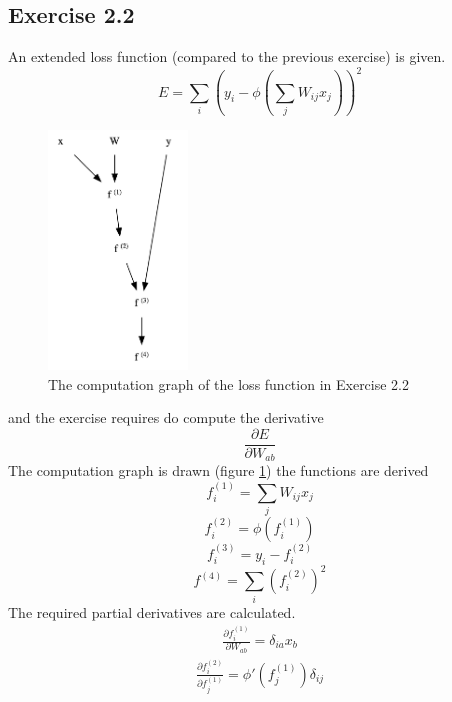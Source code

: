 \documentclass[fleqn]{article}
\begin{document}
\subsection*{Exercise 2.2}
An extended loss function (compared to the previous exercise) is given.
\begin{equation}
    E = \sum_i \left( y_i - \phi \left ( \sum_j W_{ij} x_j \right ) \right)^2
\end{equation}
\begin{figure}
    \centering
    \includegraphics[height=2.5in]{cg22.png}
    \caption{The computation graph of the loss function in Exercise 2.2}
    \label{fig:cg22}
\end{figure}
and the exercise requires do compute the derivative
\begin{equation}
    \frac{\partial E}{\partial W_{ab}}
\end{equation}
The computation graph is drawn (figure \ref{fig:cg22}) the functions are derived
\begin{equation}
    f^{(1)}_i = \sum_j W_{ij} x_j
\end{equation}
\begin{equation}
    f^{(2)}_i = \phi (f^{(1)}_i)
\end{equation}
\begin{equation}
    f^{(3)}_i = y_i - f^{(2)}_i
\end{equation}
\begin{equation}
    f^{(4)} = \sum_i \left( f^{(2)}_i \right )^2
\end{equation}
The required partial derivatives are calculated.
\begin{equation}
    \begin{split}
        \frac{\partial f^{(1)}_i}{\partial W_{ab}} = \delta_{ia} x_b
    \end{split}
\end{equation}
\begin{equation}
    \begin{split}
        \frac{\partial f^{(2)}_i}{\partial f^{(1)}_j} = \phi'(f^{(1)}_j) \delta_{ij}
    \end{split}
\end{equation}
\end{document}
